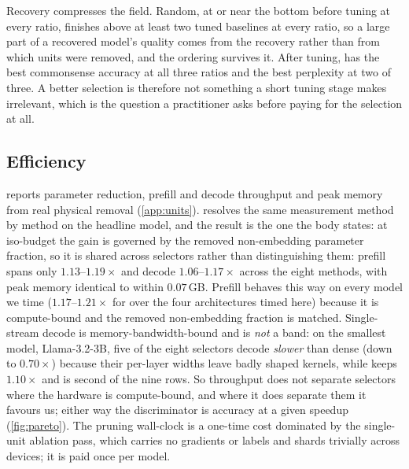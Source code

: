 Recovery compresses the field. Random, at or near the bottom
before tuning at every ratio, finishes above at least two tuned baselines at every ratio, so a large
part of a recovered model's quality comes from the recovery rather than from which units were
removed, and the ordering survives it. After tuning, \method has the best commonsense accuracy at
all three ratios and the best perplexity at two of three. A better selection is therefore not
something a short tuning stage makes irrelevant, which is the question a practitioner asks before
paying for the selection at all.

\subsection{Efficiency}

\label{app:efficiency}
 reports parameter reduction, prefill and decode throughput and peak memory from
real physical removal (\cref{app:units}).  resolves the same measurement
method by method on the headline model, and the result is the one the body states: at iso-budget the
gain is governed by the removed non-embedding parameter fraction, so it is shared across selectors
rather than distinguishing them: prefill spans only $1.13$--$1.19\times$ and decode
$1.06$--$1.17\times$ across the eight methods, with peak memory identical to within $0.07$\,GB.
Prefill behaves this way on every model we time ($1.17$--$1.21\times$ for \method over the four architectures timed here)
because it is compute-bound and the removed non-embedding fraction is matched. Single-stream decode
is memory-bandwidth-bound and is \emph{not} a band: on the smallest model, Llama-3.2-3B, five of the
eight selectors decode \emph{slower} than dense (down to $0.70\times$) because their per-layer widths
leave badly shaped kernels, while \method keeps $1.10\times$ and is second of the nine rows. So
throughput does not separate selectors where the hardware is compute-bound, and where it does
separate them it favours us; either way the discriminator is accuracy at a given speedup
(\cref{fig:pareto}). The pruning wall-clock is a one-time cost dominated by the single-unit ablation
pass, which carries no gradients or labels and shards trivially across devices; it is paid once per
model.

